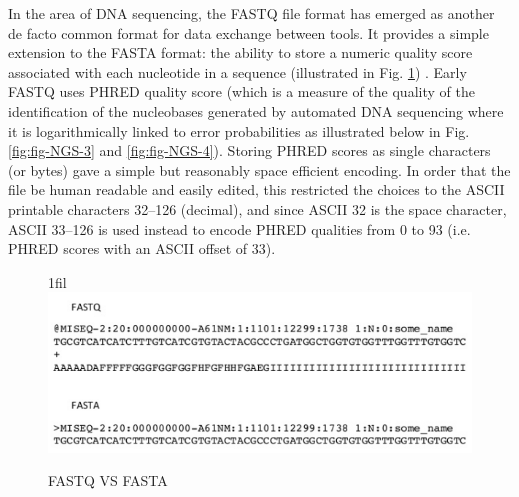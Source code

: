 \documentclass[12pt,openany]{llncs}
\makeatletter
\newcommand*{\centerfloat}{%
  \parindent \z@
  \leftskip \z@ \@plus 1fil \@minus \textwidth
  \rightskip\leftskip
  \parfillskip \z@skip}
\makeatother
\begin{document}
In the area of DNA sequencing, the FASTQ file format has emerged as another de facto common format for data exchange between tools. It provides a simple extension to the FASTA format: the ability to store a numeric quality score associated with each nucleotide in a sequence (illustrated in Fig. \ref{fig:fig-NGS-6}) \cite{fasta-fastq2}. 
Early FASTQ uses PHRED quality score \cite{fasta-fastq0} (which is a measure of the quality of the identification of the nucleobases generated by automated DNA sequencing where it is logarithmically linked to error probabilities as illustrated below in Fig. \ref{fig:fig-NGS-3} and \ref{fig:fig-NGS-4}). Storing PHRED scores as single characters (or bytes) gave a simple but reasonably space efficient encoding. In order that the file be human readable and easily edited, this restricted the choices to the ASCII printable characters 32–126 (decimal), and since ASCII 32 is the space character, ASCII 33–126 is used instead to encode PHRED qualities from 0 to 93 (i.e. PHRED scores with an ASCII offset of 33).

\begin{figure}
	\centerfloat
	\includegraphics[width=0.9\linewidth]{./figs/NGS-6}
	\caption{\label{fig:fig-NGS-6}FASTQ VS FASTA}
\end{figure}
\end{document}
